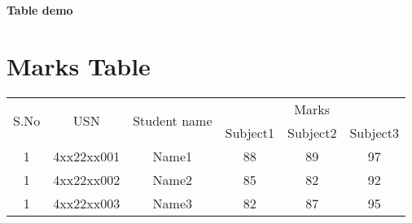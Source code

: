 \documentclass[10pt,a4paper]{article}
\begin{document}
\begin{center}
\textbf{\large Table demo}\\
\vspace{2cm}
\end{center}

\section*{Marks Table}
\begin{tabular}{|c|c|c|c|c|c|} \hline
\multirow{2}{*}{S.No} & \multirow{2}{*}{USN} & \multirow{2}{*}{Student name} & \multicolumn{3}{c|}{Marks}\\

\cline{4-6} &&& Subject1 & Subject2 & Subject3 \\ \hline
1 & 4xx22xx001 & Name1 & 88 & 89 & 97\\ \hline
1 & 4xx22xx002 & Name2 & 85 & 82 & 92\\ \hline
1 & 4xx22xx003 & Name3 & 82 & 87 & 95\\ \hline
\end{tabular}
\end{document}
